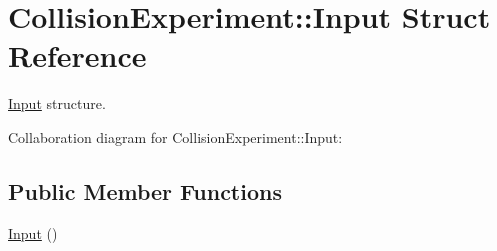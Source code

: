 \hypertarget{structCollisionExperiment_1_1Input}{}\section{Collision\+Experiment\+:\+:Input Struct Reference}
\label{structCollisionExperiment_1_1Input}


\hyperlink{structCollisionExperiment_1_1Input}{Input} structure.  




Collaboration diagram for Collision\+Experiment\+:\+:Input\+:
\subsection*{Public Member Functions}
\begin{DoxyCompactItemize}
\item 
\hyperlink{structCollisionExperiment_1_1Input_abace55531b61ad838743445d77768587}{Input} ()
\end{DoxyCompactItemize}
